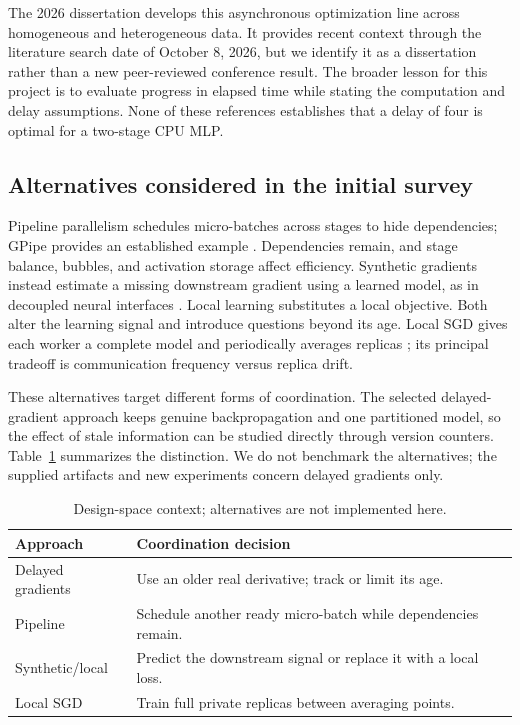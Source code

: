 \documentclass[conference]{IEEEtran}
\begin{document}
The 2026 dissertation \cite{recent2026} develops this asynchronous optimization line across homogeneous and heterogeneous data. It provides recent context through the literature search date of October 8, 2026, but we identify it as a dissertation rather than a new peer-reviewed conference result. The broader lesson for this project is to evaluate progress in elapsed time while stating the computation and delay assumptions. None of these references establishes that a delay of four is optimal for a two-stage CPU MLP.

\subsection{Alternatives considered in the initial survey}
Pipeline parallelism schedules micro-batches across stages to hide dependencies; GPipe provides an established example \cite{gpipe}. Dependencies remain, and stage balance, bubbles, and activation storage affect efficiency. Synthetic gradients instead estimate a missing downstream gradient using a learned model, as in decoupled neural interfaces \cite{synthetic}. Local learning substitutes a local objective. Both alter the learning signal and introduce questions beyond its age. Local SGD gives each worker a complete model and periodically averages replicas \cite{local}; its principal tradeoff is communication frequency versus replica drift.

These alternatives target different forms of coordination. The selected delayed-gradient approach keeps genuine backpropagation and one partitioned model, so the effect of stale information can be studied directly through version counters. Table~\ref{tab:space} summarizes the distinction. We do not benchmark the alternatives; the supplied artifacts and new experiments concern delayed gradients only.

\begin{table}[t]
\caption{Design-space context; alternatives are not implemented here.}\label{tab:space}
\centering\small
\begin{tabular}{p{}p{}}
\toprule Approach & Coordination decision \\\midrule
Delayed gradients & Use an older real derivative; track or limit its age.\\
Pipeline & Schedule another ready micro-batch while dependencies remain.\\
Synthetic/local & Predict the downstream signal or replace it with a local loss.\\
Local SGD & Train full private replicas between averaging points.\\\bottomrule
\end{tabular}
\end{table}
\end{document}
